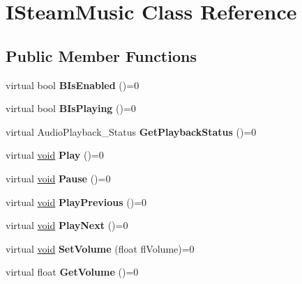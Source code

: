 \hypertarget{classISteamMusic}{}\section{I\+Steam\+Music Class Reference}
\label{classISteamMusic}
\subsection*{Public Member Functions}
\begin{DoxyCompactItemize}
\item 
\hypertarget{classISteamMusic_a5e67a1fa14f11e4c0f1ae5d4985e1ac4}{}virtual bool {\bfseries B\+Is\+Enabled} ()=0\label{classISteamMusic_a5e67a1fa14f11e4c0f1ae5d4985e1ac4}

\item 
\hypertarget{classISteamMusic_adf9328735053c6fab810902684747fdf}{}virtual bool {\bfseries B\+Is\+Playing} ()=0\label{classISteamMusic_adf9328735053c6fab810902684747fdf}

\item 
\hypertarget{classISteamMusic_a7f6465dd0f371f6eb0f339a2deb51169}{}virtual Audio\+Playback\+\_\+\+Status {\bfseries Get\+Playback\+Status} ()=0\label{classISteamMusic_a7f6465dd0f371f6eb0f339a2deb51169}

\item 
\hypertarget{classISteamMusic_ad5813f41835eb110d34b3f04d9fb8932}{}virtual \hyperlink{SDL__audio_8h_a52835ae37c4bb905b903cbaf5d04b05f}{void} {\bfseries Play} ()=0\label{classISteamMusic_ad5813f41835eb110d34b3f04d9fb8932}

\item 
\hypertarget{classISteamMusic_a966ffee67d60baf0212bea5eb31a22af}{}virtual \hyperlink{SDL__audio_8h_a52835ae37c4bb905b903cbaf5d04b05f}{void} {\bfseries Pause} ()=0\label{classISteamMusic_a966ffee67d60baf0212bea5eb31a22af}

\item 
\hypertarget{classISteamMusic_a6dc97f6bfe5be385b0aa4b8d9103ab94}{}virtual \hyperlink{SDL__audio_8h_a52835ae37c4bb905b903cbaf5d04b05f}{void} {\bfseries Play\+Previous} ()=0\label{classISteamMusic_a6dc97f6bfe5be385b0aa4b8d9103ab94}

\item 
\hypertarget{classISteamMusic_ae3dc9c2f43a0ee3697a34c3c8788481e}{}virtual \hyperlink{SDL__audio_8h_a52835ae37c4bb905b903cbaf5d04b05f}{void} {\bfseries Play\+Next} ()=0\label{classISteamMusic_ae3dc9c2f43a0ee3697a34c3c8788481e}

\item 
\hypertarget{classISteamMusic_ab6bb839b350ef10ce740fd86a7cbf3f8}{}virtual \hyperlink{SDL__audio_8h_a52835ae37c4bb905b903cbaf5d04b05f}{void} {\bfseries Set\+Volume} (float fl\+Volume)=0\label{classISteamMusic_ab6bb839b350ef10ce740fd86a7cbf3f8}

\item 
\hypertarget{classISteamMusic_a8e8b571c3bd8d6ac02ef09a838997ac1}{}virtual float {\bfseries Get\+Volume} ()=0\label{classISteamMusic_a8e8b571c3bd8d6ac02ef09a838997ac1}

\end{DoxyCompactItemize}


